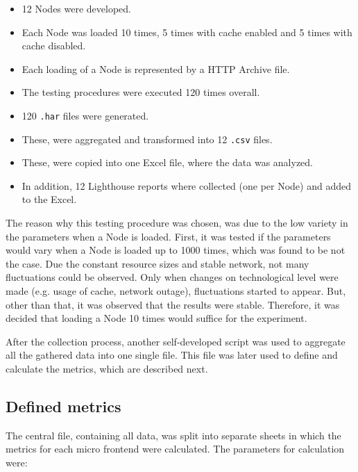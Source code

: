 \begin{itemize}[noitemsep]
	\item 12 Nodes were developed.
	\item Each Node was loaded 10 times, 5 times with cache enabled and 5 times with cache disabled.
	\item Each loading of a Node is represented by a HTTP Archive file.
	\item The testing procedures were executed 120 times overall.
	\item 120 \texttt{.har} files were generated.
	\item These, were aggregated and transformed into 12 \texttt{.csv} files.
	\item These, were copied into one Excel file, where the data was analyzed.
	\item In addition, 12 Lighthouse reports where collected (one per Node) and added to the Excel.
\end{itemize}

The reason why this testing procedure was chosen, was due to the low variety in the parameters when a Node is loaded. 
First, it was tested if the parameters would vary when a Node is loaded up to 1000 times, which was found to be not the case. 
Due the constant resource sizes and stable network, not many fluctuations could be observed. 
Only when changes on technological level were made (e.g. usage of cache, network outage), fluctuations started to appear. 
But, other than that, it was observed that the results were stable. Therefore, it was decided that loading a Node 10 times would suffice for the experiment.

After the collection process, another self-developed script was used to aggregate all the gathered data into one single file. This file was later used to define and calculate the metrics, which are described next.

\subsection{Defined metrics}
\label{metric_definition}
The central file, containing all data, was split into separate sheets in which the metrics for each micro frontend were calculated. The parameters for calculation were:

